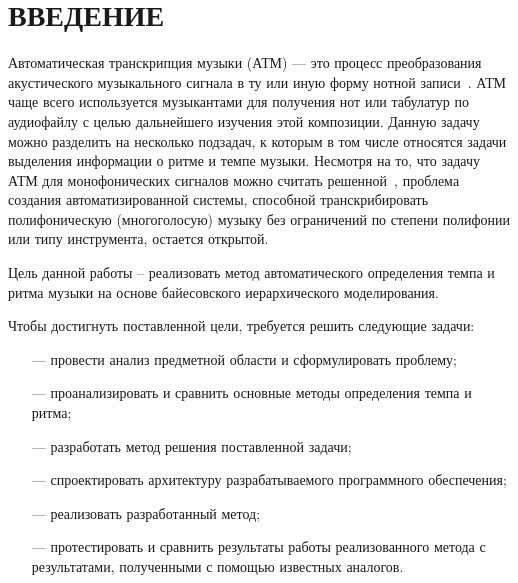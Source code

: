 \section*{ВВЕДЕНИЕ}

Автоматическая транскрипция музыки (АТМ) — это процесс преобразования акустического музыкального сигнала в ту или иную форму нотной записи~\cite{future_dir}. АТМ чаще всего используется музыкантами для получения нот или табулатур по аудиофайлу с целью дальнейшего изучения этой композиции. Данную задачу можно разделить на несколько подзадач, к которым в том числе относятся задачи выделения информации о ритме и темпе музыки. Несмотря на то, что задачу АТМ для монофонических сигналов можно считать решенной~\cite{future_dir}, проблема создания автоматизированной системы, способной транскрибировать полифоническую (многоголосую) музыку без ограничений по степени полифонии или типу инструмента, остается открытой.

Цель данной работы – реализовать метод автоматического определения темпа и ритма музыки на основе байесовского иерархического моделирования.

Чтобы достигнуть поставленной цели, требуется решить следующие задачи:
\begin{itemize}
	\item[---] провести анализ предметной области и сформулировать проблему;
	\item[---] проанализировать и сравнить основные методы определения темпа и ритма;
	\item[---] разработать метод решения поставленной задачи;
	\item[---] спроектировать архитектуру разрабатываемого программного обеспечения;
	\item[---] реализовать разработанный метод;
	\item[---] протестировать и сравнить результаты работы реализованного метода с результатами, полученными с помощью известных аналогов.
\end{itemize}